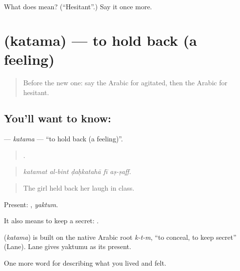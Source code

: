 \begin{tcolorbox}[breakable,colback=teal!4,colframe=teal!35!black,title={Before you move on}]
What does  mean? (\textquotedblleft{}Hesitant\textquotedblright{}.) Say it once more.
\end{tcolorbox}
\section[\texorpdfstring{\ar{كتم} (katama)}{كتم (katama)}]{ (katama) — to hold back (a feeling)}

\label{lesson:AR-C497-katama}



\begin{quote}
Before the new one: say the Arabic for agitated, then the Arabic for hesitant.
\end{quote}

\subsection*{You'll want to know: }
\textbf{} — \emph{katama} — \textquotedblleft{}to hold back (a feeling)\textquotedblright{}.

\begin{quote}
    .
\end{quote}

\begin{quote}
\emph{katamat al-bint ḍaḥkatahā fī aṣ-ṣaff.}
\end{quote}

\begin{quote}
The girl held back her laugh in class.
\end{quote}

Present: , \emph{yaktum}.

It also means to keep a secret:  .

\begin{cousinweb}
\textbf{} (\emph{katama}) is built on the native Arabic root \emph{k-t-m}, \textquotedblleft{}to conceal, to keep secret\textquotedblright{} (Lane). Lane gives yaktumu as its present.
\end{cousinweb}

\begin{grammarlens}[title={What you've built}]
One more word for describing what you lived and felt.
\end{grammarlens}

